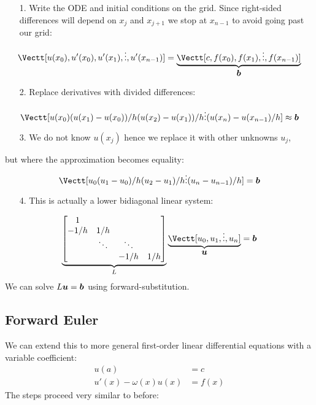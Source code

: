 \begin{itemize}
\item[1. ] Write the ODE and initial conditions on the grid. Since right-sided differences will depend on $x_j$ and $x_{j+1}$ we stop at $x_{n-1}$ to avoid going past our grid: 

\end{itemize}
\[
\Vectt[u(x_0) , 
     u'(x_0) ,
u'(x_1) ,
\ensuremath{\vdots} ,
u'(x_{n-1})] = \underbrace{\Vectt[c, f(x_0), f(x_1), \ensuremath{\vdots} , f(x_{n-1})]}_{\ensuremath{\bm{\b}}}
\]
\begin{itemize}
\item[2. ] Replace derivatives with divided differences:

\end{itemize}
\[
\Vectt[u(x_0) \\ 
(u(x_1) - u(x_0))/h \\
(u(x_2) - u(x_1))/h \\
\ensuremath{\vdots} \\
(u(x_n) - u(x_{n-1})/h] \ensuremath{\approx} \ensuremath{\bm{\b}}
\]
\begin{itemize}
\item[3. ] We do not know $u(x_j)$ hence we replace it with other unknowns $u_j$,

\end{itemize}
but where the approximation becomes equality:
\[
\Vectt[u_0 \\ 
(u_1 - u_0)/h \\
(u_2 - u_1)/h \\
\ensuremath{\vdots} \\
(u_n - u_{n-1})/h] = \ensuremath{\bm{\b}}
\]
\begin{itemize}
\item[4. ] This is actually a lower bidiagonal linear system:

\end{itemize}
\[
\underbrace{\begin{bmatrix}
    1 \\ 
    -1/h & 1/h \\
    & \ensuremath{\ddots} & \ensuremath{\ddots} \\
    && -1/h & 1/h \end{bmatrix}}_L \underbrace{\Vectt[u_0,u_1,\ensuremath{\vdots},u_n]}_{\ensuremath{\bm{\u}}} = \ensuremath{\bm{\b}}
\]
We can solve $L \bm{{\mbox{\boldmath$u$\unboldmath}}} = \bm{{\mbox{\boldmath$b$\unboldmath}}}$ using forward-substitution.

\subsection{Forward Euler}
We can extend this to more general first-order linear differential equations with a variable coefficient:
\begin{align*}
u(a) &= c \\
u'(x) - \ensuremath{\omega}(x) u(x) &= f(x)
\end{align*}
The steps proceed very similar to before:

